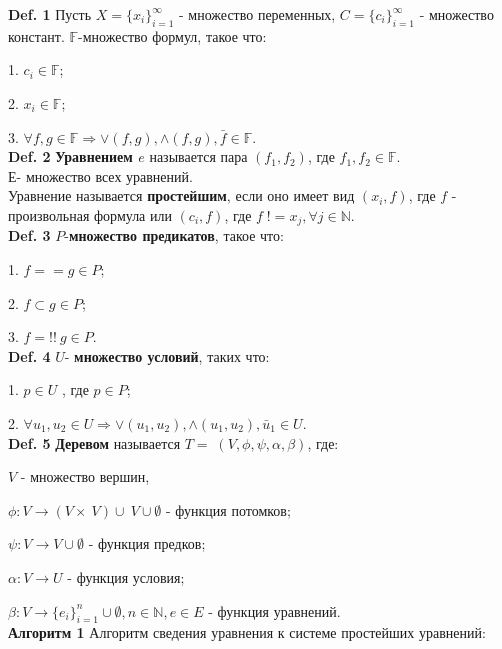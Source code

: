 \documentclass[12pt]{article}
\begin{document}
 
	{\bf Def. 1} Пусть $X = \lbrace  x_{i}  \rbrace_{i=1}^{\infty} $ - множество переменных,
	$C = \lbrace  c_{i}  \rbrace_{i=1}^{\infty} $ - множество констант. $\mathbb{F}$-множество формул, такое что:
	
	1. $c_{i} \in \mathbb{F} $; 
	
	2. $x_{i} \in \mathbb{F} $; 
	
	3. $\forall f, g \in \mathbb{F} \Rightarrow \vee(f,g), \wedge(f,g), \bar f \in \mathbb{F}$.
	\\

	{\bf Def. 2} {\bf Уравнением  $e$} называется пара $(f_{1},f_{2})$, где $f_{1},f_{2} \in \mathbb{F}$.\\Е- множество всех уравнений.
	\\Уравнение называется {\bf простейшим}, если оно имеет вид $(x_{i}, f)$, где $f$ - произвольная формула или $(c_{i}, f)$, где $f \; != x_{j}, \forall j \in \mathbb{N}$.
	\\
	
	{\bf Def. 3} $P$-{\bf множество предикатов}, такое что: 
	
	1. $f==g \in P$; 
	
    2. $f \subset g \in P$;
    
    3. $f =!! \: g \in P$.
    \\
    
    {\bf Def. 4}  $U$- {\bf множество условий}, таких что: 
    
    1. $p \in U$ , где $p \in P$;
    
    2. $\forall u_{1}, u_{2} \in U \Rightarrow \vee(u_{1},u_{2}), \wedge(u_{1},u_{2}), \bar u_{1} \in U$.
    \\
    
     \hypertarget{d5}{{\bf Def. 5}} {\bf Деревом} называется $T = \; (V,\phi,\psi, \alpha, \beta)$, где: 
     
     $V$ - множество вершин,
     
      $\phi : V \rightarrow (V\times \:V)\cup \:V \cup \emptyset$ - функция потомков;
      
      $\psi : V \rightarrow V \cup \emptyset$ - функция предков;
      
      $\alpha : V \rightarrow U$ - функция условия;
      
      $\beta : V \rightarrow \lbrace  e_{i}  \rbrace_{i=1}^{n} \cup \emptyset, n \in \mathbb{N}, e \in E $ - функция уравнений.
     \\
     
     \hypertarget{a1}{{\bf Алгоритм 1}}
     Алгоритм сведения уравнения к системе простейших уравнений:
     
\end{document}
